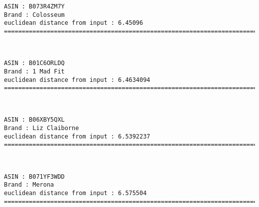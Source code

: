 \documentclass[11pt]{article}
\begin{document}
    \begin{Verbatim}[commandchars=\\\{\}]
ASIN : B073R4ZM7Y
Brand : Colosseum
euclidean distance from input : 6.45096
=============================================================================================================================

    \end{Verbatim}

    \begin{center}
    \end{center}
    { \hspace*{\fill} \\}
    
    \begin{Verbatim}[commandchars=\\\{\}]
ASIN : B01C6ORLDQ
Brand : 1 Mad Fit
euclidean distance from input : 6.4634094
=============================================================================================================================

    \end{Verbatim}

    \begin{center}
    \end{center}
    { \hspace*{\fill} \\}
    
    \begin{Verbatim}[commandchars=\\\{\}]
ASIN : B06XBY5QXL
Brand : Liz Claiborne
euclidean distance from input : 6.5392237
=============================================================================================================================

    \end{Verbatim}

    \begin{center}
    \end{center}
    { \hspace*{\fill} \\}
    
    \begin{Verbatim}[commandchars=\\\{\}]
ASIN : B071YF3WDD
Brand : Merona
euclidean distance from input : 6.575504
=============================================================================================================================

    \end{Verbatim}
\end{document}
